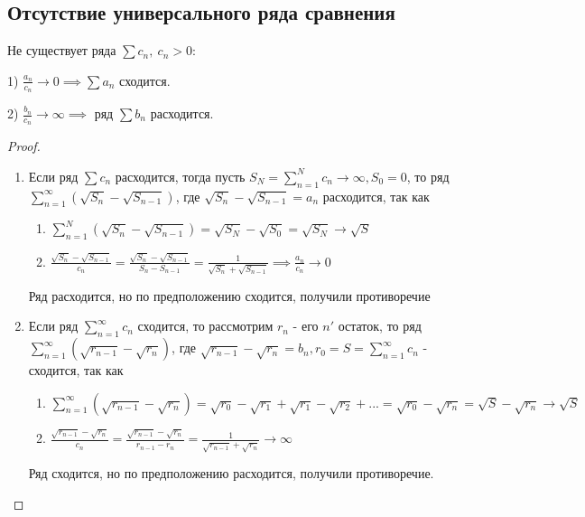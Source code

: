 \subsection{Отсутствие универсального ряда сравнения}
	\begin{proposal}
	Не существует ряда $\sum c_n,\ c_n > 0:$ 
	
	1) $\frac{a_n}{c_n} \to 0 \implies \sum a_n$ сходится.
	
	2) $\frac{b_n}{c_n} \to \infty \implies$ ряд $\sum b_n$ расходится.
\end{proposal}

\begin{proof}~
	
	\begin{enumerate}
		\item Если ряд $\sum c_n$ расходится, тогда пусть $S_N = \sum_{n=1}^{N} c_n \to \infty, S_0=0$, то ряд $\sum_{n=1}^{\infty} (\sqrt{S_n} - \sqrt{S_{n - 1}})$, где $\sqrt{S_n} - \sqrt{S_{n - 1}} = a_n$ расходится, так как
		
		\begin{enumerate}
			\item $\sum_{n=1}^{N} (\sqrt{S_n} - \sqrt{S_{n-1}}) = \sqrt{S_N} - \sqrt{S_0} = \sqrt{S_N} \to \sqrt{S}$
			
			\item $\frac{\sqrt{S_n} - \sqrt{S_{n-1}}}{c_n} = \frac{\sqrt{S_n} - \sqrt{S_{n-1}}}{S_n - S_{n - 1}} = \frac{1}{\sqrt{S_n} + \sqrt{S_{n - 1}}} \implies \frac{a_n}{c_n} \to 0$
		\end{enumerate}
		
		Ряд расходится, но по предположению сходится, получили противоречие
		
		\item Если ряд $\sum_{n=1}^{\infty} c_n$ сходится, то рассмотрим $r_n$ - его $n'$ остаток, то ряд $\sum_{n=1}^{\infty} (\sqrt{r_{n-1}} - \sqrt{r_n})$, где $\sqrt{r_{n-1}} - \sqrt{r_n} = b_n, r_0 = S = \sum_{n = 1}^{\infty} c_n$ - сходится, так как
		
		\begin{enumerate}
			\item $\sum_{n=1}^{\infty} (\sqrt{r_{n-1}} - \sqrt{r_n}) = \sqrt{r_0} - \sqrt{r_1} + \sqrt{r_1} - \sqrt{r_2} + ... = \sqrt{r_0} - \sqrt{r_n} = \sqrt{S} - \sqrt{r_n} \to \sqrt{S}$
			
			\item $\frac{\sqrt{r_{n-1}} - \sqrt{r_n}}{c_n} = \frac{\sqrt{r_{n-1}} - \sqrt{r_n}}{r_{n-1} - r_n} = \frac{1}{\sqrt{r_{n-1}} + \sqrt{r_n}} \to \infty$
		\end{enumerate}
		
		Ряд сходится, но по предположению расходится, получили противоречие.
	\end{enumerate}
\end{proof}